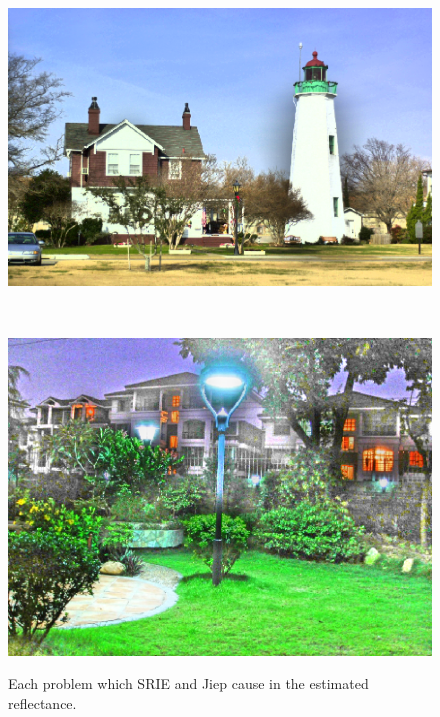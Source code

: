 \begin{figure}[tb]
	\begin{minipage}[b]{1.0\hsize}
		\centering
		\includegraphics[width=0.65\hsize]{images/problems/srie/reflectance.eps}
		 \label{fig:problem/srie/reflectance}
	\end{minipage}\\
	\begin{minipage}[b]{1.0\hsize}
		\centering
		\includegraphics[width=0.65\hsize]{images/problems/jiep/reflectance.eps}
		 \label{fig:problem/jiep/reflectance}
	\end{minipage}
	\caption{Each problem which SRIE and Jiep cause in the estimated reflectance.}
	\label{fig:problems}
\end{figure}